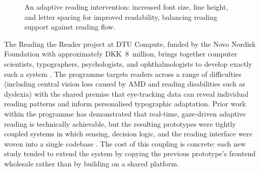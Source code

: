 \usetikzlibrary{arrows.meta, positioning}
\begin{figure}[htbp]
\centering
{}
\caption[An adaptive reading intervention.]{An adaptive reading intervention: increased font size, line height, and letter spacing for improved readability, balancing reading support against reading flow.}
\label{fig:typo-intervention}
\end{figure}

The Reading the Reader project at DTU Compute, funded by the Novo Nordisk Foundation with approximately DKK~8~million, brings together computer scientists, typographers, psychologists, and ophthalmologists to develop exactly such a system \cite{dtucompute2025rtr, nnf2023rtr}.
The programme targets readers across a range of difficulties (including central vision loss caused by AMD and reading disabilities such as dyslexia) with the shared premise that eye-tracking data can reveal individual reading patterns and inform personalised typographic adaptation.
Prior work within the programme has demonstrated that real-time, gaze-driven adaptive reading is technically achievable, but the resulting prototypes were tightly coupled systems in which sensing, decision logic, and the reading interface were woven into a single codebase \cite{refsgaard2024rtr, pereira2024typography, palinec2024reactive}.
The cost of this coupling is concrete: each new study tended to extend the system by copying the previous prototype's frontend wholesale rather than by building on a shared platform.

